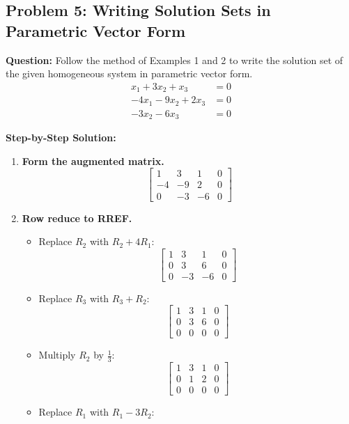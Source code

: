 \documentclass[11pt]{article}
\begin{document}
\subsection*{Problem 5: Writing Solution Sets in Parametric Vector Form}
\textbf{Question:} Follow the method of Examples 1 and 2 to write the solution set of the given homogeneous system in parametric vector form.
\begin{align*}
    x_1 + 3x_2 + x_3 &= 0 \\
    -4x_1 - 9x_2 + 2x_3 &= 0 \\
    -3x_2 - 6x_3 &= 0
\end{align*}

\textbf{Step-by-Step Solution:}
\begin{enumerate}
    \item \textbf{Form the augmented matrix.}
    \[
    \left[ \begin{array}{ccc|c}
    1 & 3 & 1 & 0 \\
    -4 & -9 & 2 & 0 \\
    0 & -3 & -6 & 0
    \end{array} \right]
    \]
    \item \textbf{Row reduce to RREF.}
    \begin{itemize}
        \item Replace $R_2$ with $R_2 + 4R_1$:
        \[
        \left[ \begin{array}{ccc|c}
        1 & 3 & 1 & 0 \\
        0 & 3 & 6 & 0 \\
        0 & -3 & -6 & 0
        \end{array} \right]
        \]
        \item Replace $R_3$ with $R_3 + R_2$:
        \[
        \left[ \begin{array}{ccc|c}
        1 & 3 & 1 & 0 \\
        0 & 3 & 6 & 0 \\
        0 & 0 & 0 & 0
        \end{array} \right]
        \]
        \item Multiply $R_2$ by $\frac{1}{3}$:
        \[
        \left[ \begin{array}{ccc|c}
        1 & 3 & 1 & 0 \\
        0 & 1 & 2 & 0 \\
        0 & 0 & 0 & 0
        \end{array} \right]
        \]
        \item Replace $R_1$ with $R_1 - 3R_2$:
        \[
\]
\end{itemize}
\end{enumerate}
\end{document}

